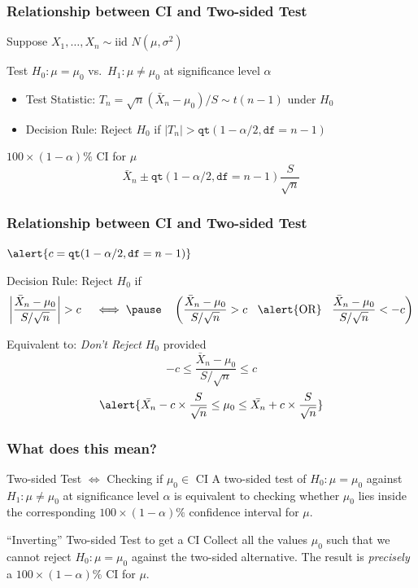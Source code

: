 \documentclass[handout]{beamer}
\begin{document}
\begin{frame}
\frametitle{Relationship between CI and Two-sided Test}
Suppose $X_1, \hdots, X_n \sim \mbox{iid } N(\mu,\sigma^2)$

\vspace{1em}
	\begin{block}{Test $H_0\colon \mu = \mu_0$ vs.\ $H_1\colon \mu \neq \mu_0$ at significance level $\alpha$} 
		\begin{itemize}
			\item Test Statistic:  $T_n = \sqrt{n}(\bar{X}_n - \mu_0)/S \sim t(n-1)$ under $H_0$ 
			\item Decision Rule: Reject $H_0$ if $|T_n| > \texttt{qt}(1-\alpha/2, \texttt{df}=n-1)$ 
			\end{itemize}

			\pause
\end{block}
	\begin{block}{$100\times (1-\alpha)\%$ CI for $\mu$} 
		$$\bar{X}_n \pm \texttt{qt}(1-\alpha/2, \texttt{df}=n-1) \frac{S}{\sqrt{n}}$$
\end{block}
\end{frame}
\begin{frame}
\frametitle{Relationship between CI and Two-sided Test}
$\alert{c =  \texttt{qt}(1-\alpha/2, \texttt{df}=n-1)}$
\begin{block}{Decision Rule: Reject $H_0$ if}
		$$\left|\frac{\bar{X}_n - \mu_0}{S/\sqrt{n}} \right|> c \quad \iff \pause  \quad \left(\frac{\bar{X}_n - \mu_0}{S/\sqrt{n}}> c \;\;\mbox{  \alert{OR}  }\;\;\frac{\bar{X}_n - \mu_0}{S/\sqrt{n}}< - c\right)$$
\end{block}

\pause
\begin{block}{Equivalent to: \emph{Don't Reject} $H_0$ provided}
	$$-c \leq \frac{\bar{X}_n - \mu_0}{S/\sqrt{n}}\leq c $$ \pause
	$$\alert{\bar{X_n} - c\times \frac{S}{\sqrt{n}} \leq \mu_0 \leq \bar{X_n} + c\times \frac{S}{\sqrt{n}}}$$
\end{block}
\end{frame}
\begin{frame}
\frametitle{What does this mean?}

\begin{block}
	{Two-sided Test $\iff$ Checking if $\mu_0 \in$ CI}
	A two-sided test of $H_0\colon \mu = \mu_0$ against $H_1\colon \mu\neq \mu_0 $ at significance level $\alpha$ is equivalent to checking whether $\mu_0$ lies inside the corresponding $100\times (1-\alpha)\%$ confidence interval for $\mu$.
\end{block}

\pause

\begin{block}
	{``Inverting'' Two-sided Test to get a CI}	
	Collect all the values $\mu_0$ such that we cannot reject $H_0\colon \mu = \mu_0$ against the two-sided alternative. The result is \emph{precisely} a $100\times (1-\alpha)\%$ CI for $\mu$.
\end{block}
\end{frame}
\end{document}

